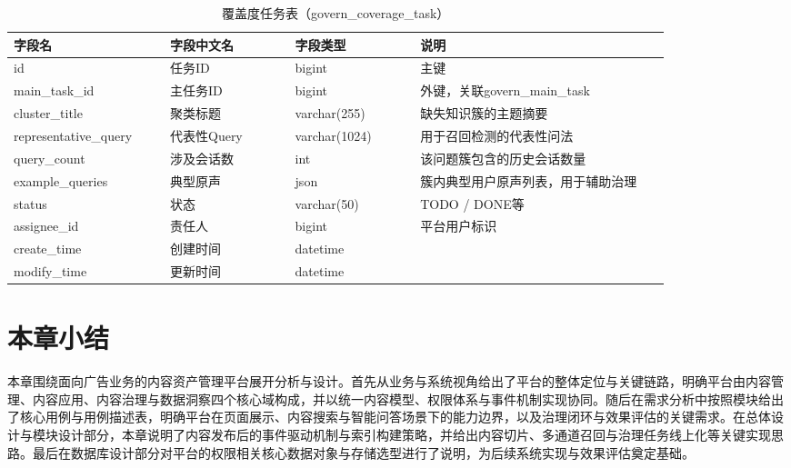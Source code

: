 \begin{table}[!htbp]
  \centering
  \caption{覆盖度任务表（govern\_coverage\_task）}
  \label{tab:db_govern_coverage_task}
  \small
  \begin{tabular}{>{\raggedright\arraybackslash}p{0.20\linewidth}|>{\raggedright\arraybackslash}p{0.16\linewidth}|>{\raggedright\arraybackslash}p{0.16\linewidth}|>{\raggedright\arraybackslash}p{0.32\linewidth}}
    \hline
    字段名 & 字段中文名 & 字段类型 & 说明 \\ \hline
    id & 任务ID & bigint & 主键 \\ \hline
    main\_task\_id & 主任务ID & bigint & 外键，关联govern\_main\_task \\ \hline
    cluster\_title & 聚类标题 & varchar(255) & 缺失知识簇的主题摘要 \\ \hline
    representative\_query & 代表性Query & varchar(1024) & 用于召回检测的代表性问法 \\ \hline
    query\_count & 涉及会话数 & int & 该问题簇包含的历史会话数量 \\ \hline
    example\_queries & 典型原声 & json & 簇内典型用户原声列表，用于辅助治理 \\ \hline
    status & 状态 & varchar(50) & TODO / DONE等 \\ \hline
    assignee\_id & 责任人 & bigint & 平台用户标识 \\ \hline
    create\_time & 创建时间 & datetime & \\ \hline
    modify\_time & 更新时间 & datetime & \\ \hline
  \end{tabular}
\end{table}

\FloatBarrier

\section{本章小结}
本章围绕面向广告业务的内容资产管理平台展开分析与设计。首先从业务与系统视角给出了平台的整体定位与关键链路，明确平台由内容管理、内容应用、内容治理与数据洞察四个核心域构成，并以统一内容模型、权限体系与事件机制实现协同。随后在需求分析中按照模块给出了核心用例与用例描述表，明确平台在页面展示、内容搜索与智能问答场景下的能力边界，以及治理闭环与效果评估的关键需求。在总体设计与模块设计部分，本章说明了内容发布后的事件驱动机制与索引构建策略，并给出内容切片、多通道召回与治理任务线上化等关键实现思路。最后在数据库设计部分对平台的权限相关核心数据对象与存储选型进行了说明，为后续系统实现与效果评估奠定基础。
